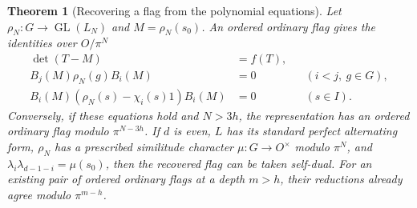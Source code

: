 \documentclass[a4paper,11pt]{article}
\newtheorem{theorem}[proposition]{Theorem}
\theoremstyle{definition}
\theoremstyle{remark}
\numberwithin{equation}{section}
\begin{document}
\begin{theorem}[Recovering a flag from the polynomial equations]
\leavevmode\label{thm:finiteflag546}
Let \(\rho_N:G\to\operatorname{GL}(L_N)\) and
\(M=\rho_N(s_0)\). An ordered ordinary flag gives the
identities over \(O/\pi^N\)
\begin{align*}
   \det(T-M)&=f(T),\\
   B_j(M)\rho_N(g)B_i(M)&=0 &&(i<j,\ g\in G),\\
   B_i(M)(\rho_N(s)-\chi_i(s)1)B_i(M)&=0 &&(s\in I).
\end{align*}
Conversely, if these equations hold and \(N>3h\), the
representation has an ordered ordinary flag modulo
\(\pi^{N-3h}\). If \(d\) is even, \(L\) has its standard
perfect alternating form, \(\rho_N\) has a prescribed
similitude character \(\mu:G\to O^\times\) modulo \(\pi^N\),
and \(\lambda_i\lambda_{d-1-i}=\mu(s_0)\), then the recovered
flag can be taken self-dual. For an existing pair of ordered
ordinary flags at a depth \(m>h\), their reductions already
agree modulo \(\pi^{m-h}\).
\end{theorem}
\end{document}

